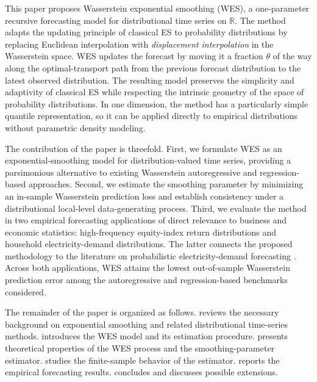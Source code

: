 \documentclass[a4paper, 11pt]{article}
\theoremstyle{definition}
\begin{document}
This paper proposes Wasserstein exponential smoothing (WES), a one-parameter recursive forecasting model for distributional time series on $\mathbb R$. The method adapts the updating principle of classical ES to probability distributions by replacing Euclidean interpolation with \emph{displacement interpolation} in the Wasserstein space. WES updates the forecast by moving it a fraction $\theta$ of the way along the optimal-transport path from the previous forecast distribution to the latest observed distribution. The resulting model preserves the simplicity and adaptivity of classical ES while respecting the intrinsic geometry of the space of probability distributions. In one dimension, the method has a particularly simple quantile representation, so it can be applied directly to empirical distributions without parametric density modeling.

The contribution of the paper is threefold. First, we formulate WES as an exponential-smoothing model for distribution-valued time series, providing a parsimonious alternative to existing Wasserstein autoregressive and regression-based approaches. Second, we estimate the smoothing parameter by minimizing an in-sample Wasserstein prediction loss and establish consistency under a distributional local-level data-generating process. Third, we evaluate the method in two empirical forecasting applications of direct relevance to business and economic statistics: high-frequency equity-index return distributions and household electricity-demand distributions. The latter connects the proposed methodology to the literature on probabilistic electricity-demand forecasting \citep{HongFan2016}. Across both applications, WES attains the lowest out-of-sample Wasserstein prediction error among the autoregressive and regression-based benchmarks considered.

The remainder of the paper is organized as follows.  reviews the necessary background on exponential smoothing and related distributional time-series methods.  introduces the WES model and its estimation procedure.  presents theoretical properties of the WES process and the smoothing-parameter estimator.  studies the finite-sample behavior of the estimator.  reports the empirical forecasting results.  concludes and discusses possible extensions.



\end{document}
